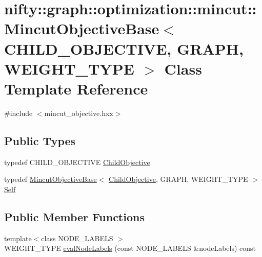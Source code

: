 \hypertarget{classnifty_1_1graph_1_1optimization_1_1mincut_1_1MincutObjectiveBase}{}\section{nifty\+:\+:graph\+:\+:optimization\+:\+:mincut\+:\+:Mincut\+Objective\+Base$<$ C\+H\+I\+L\+D\+\_\+\+O\+B\+J\+E\+C\+T\+I\+V\+E, G\+R\+A\+P\+H, W\+E\+I\+G\+H\+T\+\_\+\+T\+Y\+P\+E $>$ Class Template Reference}
\label{classnifty_1_1graph_1_1optimization_1_1mincut_1_1MincutObjectiveBase}


{\ttfamily \#include $<$mincut\+\_\+objective.\+hxx$>$}

\subsection*{Public Types}
\begin{DoxyCompactItemize}
\item 
typedef C\+H\+I\+L\+D\+\_\+\+O\+B\+J\+E\+C\+T\+I\+V\+E \hyperlink{classnifty_1_1graph_1_1optimization_1_1mincut_1_1MincutObjectiveBase_a6943abac42bd9b021bb69094dc3c42c1}{Child\+Objective}
\item 
typedef \hyperlink{classnifty_1_1graph_1_1optimization_1_1mincut_1_1MincutObjectiveBase}{Mincut\+Objective\+Base}$<$ \hyperlink{classnifty_1_1graph_1_1optimization_1_1mincut_1_1MincutObjectiveBase_a6943abac42bd9b021bb69094dc3c42c1}{Child\+Objective}, G\+R\+A\+P\+H, W\+E\+I\+G\+H\+T\+\_\+\+T\+Y\+P\+E $>$ \hyperlink{classnifty_1_1graph_1_1optimization_1_1mincut_1_1MincutObjectiveBase_a6711b53c0f9ff2db5f3e0ab9e35a11ac}{Self}
\end{DoxyCompactItemize}
\subsection*{Public Member Functions}
\begin{DoxyCompactItemize}
\item 
{\footnotesize template$<$class N\+O\+D\+E\+\_\+\+L\+A\+B\+E\+L\+S $>$ }\\W\+E\+I\+G\+H\+T\+\_\+\+T\+Y\+P\+E \hyperlink{classnifty_1_1graph_1_1optimization_1_1mincut_1_1MincutObjectiveBase_a5908b8124c57c6965427a43ee9e02658}{eval\+Node\+Labels} (const N\+O\+D\+E\+\_\+\+L\+A\+B\+E\+L\+S \&node\+Labels) const 
\end{DoxyCompactItemize}


